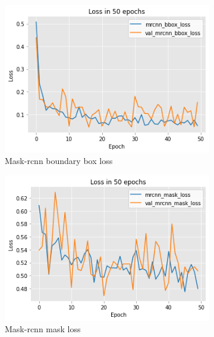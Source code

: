 \documentclass[../Head/Main.tex]{subfiles}
\begin{document}
\begin{figure}[H]
    \centering
    \begin{subfigure}[t]{.32\textwidth}
        \centering
        \includegraphics[width=\textwidth]{../Figures/rcnn_results/loss/plot_bigdata5.png}
        \caption{Mask-rcnn boundary box loss}
        \label{fig:mrcnn_bbox_loss_bigdata}
    \end{subfigure}
    \hfill
    \begin{subfigure}[t]{.32\textwidth}
        \centering
        \includegraphics[width=\textwidth]{../Figures/rcnn_results/loss/plot_bigdata6.png}
        \caption{Mask-rcnn mask loss}
        \label{fig:mrcnn_mask_loss_bigdata}
    \end{subfigure}
    \hfill
    \begin{subfigure}[t]{.32\textwidth}

\end{subfigure}
\end{figure}
\end{document}
